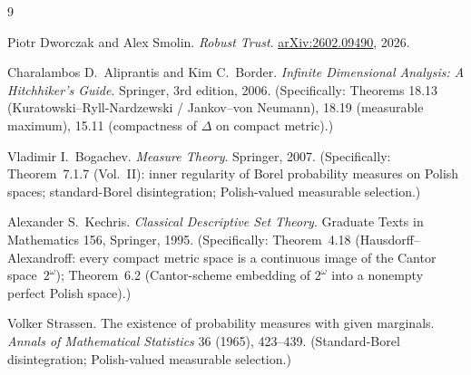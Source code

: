 \documentclass[11pt]{article}
\theoremstyle{definition}
\theoremstyle{remark}
\begin{document}
\begin{thebibliography}{9}

Piotr Dworczak and Alex Smolin.
\emph{Robust Trust}.
\href{https://arxiv.org/abs/2602.09490}{arXiv:2602.09490}, 2026.

Charalambos D.\ Aliprantis and Kim C.\ Border.
\emph{Infinite Dimensional Analysis: A Hitchhiker's Guide}.
Springer, 3rd edition, 2006.
(Specifically: Theorems 18.13 (Kuratowski--Ryll-Nardzewski /
Jankov--von Neumann), 18.19 (measurable maximum), 15.11 (compactness
of $\Delta$ on compact metric).)

Vladimir I.\ Bogachev.
\emph{Measure Theory}.
Springer, 2007.
(Specifically: Theorem~7.1.7 (Vol.~II): inner regularity of Borel
probability measures on Polish spaces; standard-Borel disintegration;
Polish-valued measurable selection.)

Alexander S.\ Kechris.
\emph{Classical Descriptive Set Theory}.
Graduate Texts in Mathematics 156, Springer, 1995.
(Specifically: Theorem~4.18 (Hausdorff--Alexandroff: every compact
metric space is a continuous image of the Cantor space~$2^\omega$);
Theorem~6.2 (Cantor-scheme embedding of $2^\omega$ into a nonempty
perfect Polish space).)

Volker Strassen.
The existence of probability measures with given marginals.
\emph{Annals of Mathematical Statistics} 36 (1965), 423--439.
(Standard-Borel disintegration; Polish-valued measurable selection.)

\end{thebibliography}
\end{document}
